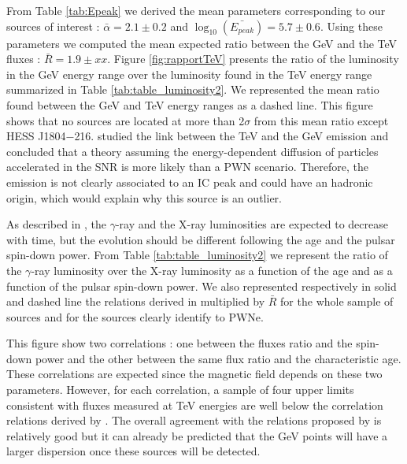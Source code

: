 From Table \ref{tab:Epeak} we derived the mean parameters corresponding to our sources of interest : $\bar{\alpha} = 2.1 \pm 0.2$ and $\log_{10}\left(\bar{E_{peak}}\right)= 5.7 \pm 0.6$. Using these parameters we computed the mean expected ratio between the GeV and the TeV fluxes : $\bar{R}=1.9 \pm xx$. Figure \ref{fig:rapportTeV} presents the ratio of the luminosity in the GeV energy range over the luminosity found in the TeV energy range summarized in Table \ref{tab:table_luminosity2}. We represented the mean ratio found between the GeV and TeV energy ranges as a dashed line. This figure shows that no sources are located at more than 2$\sigma$ from this mean ratio except HESS J1804$-$216. \cite{2012ApJ...744...80A} studied the link between the TeV and the GeV emission and concluded that a theory assuming the energy-dependent diffusion of particles accelerated in the SNR is more likely than a PWN scenario. Therefore, the emission is not clearly associated to an IC peak and could have an hadronic origin, which would explain why this source is an outlier.  

As described in \cite{2009ApJ...694...12M}, the $\gamma$-ray and the X-ray luminosities are expected to decrease with time, but the evolution should be different following the age and the pulsar spin-down power. From Table \ref{tab:table_luminosity2} we represent the ratio of the $\gamma$-ray luminosity over the X-ray luminosity as a function of the age and as a function of the pulsar spin-down power. We also represented respectively in solid and dashed line the relations derived in \cite{2009ApJ...694...12M} multiplied by $\bar{R}$ for the whole sample of sources and for the sources clearly identify to PWNe.

This figure show two correlations : one between the fluxes ratio and the spin-down power and the other between the same flux ratio and the characteristic age. These correlations are expected since the magnetic field depends on these two parameters. However, for each correlation, a sample of four upper limits consistent with fluxes measured at TeV energies are well below the correlation relations derived by \cite{2009ApJ...694...12M}. The overall agreement with the relations proposed by \cite{2009ApJ...694...12M} is relatively good but it can already be predicted that the GeV points will have a larger dispersion once these sources will be detected. 


